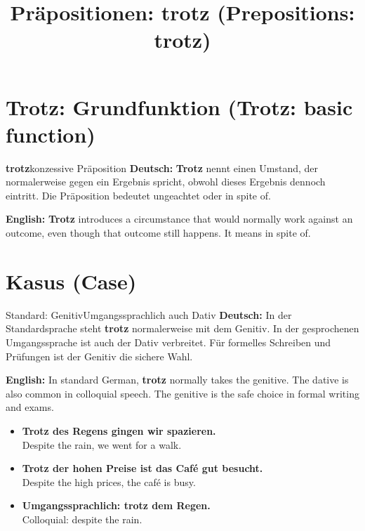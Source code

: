 \documentclass[a4paper,11pt]{article}
\title{Präpositionen: \glqq trotz\grqq{} \textnormal{(Prepositions: \glqq trotz\grqq)}}
\date{}
\newcommand{\GermanText}[1]{\textbf{Deutsch: }#1\par}
\newcommand{\EnglishText}[1]{{\small\color{SoftGray}\textbf{English: }#1\par}}
\newcommand{\ExampleItem}[2]{\item \textbf{#1}\\{\small\color{SoftGray}#2}}
\begin{document}
\maketitle
\tableofcontents
\newpage

\section{Trotz: Grundfunktion \textnormal{(Trotz: basic function)}}
\begin{grammarentry}{\textbf{trotz}}{konzessive Präposition}
\GermanText{\textbf{Trotz} nennt einen Umstand, der normalerweise gegen ein Ergebnis spricht, obwohl dieses Ergebnis dennoch eintritt. Die Präposition bedeutet \glqq ungeachtet\grqq{} oder \glqq in spite of\grqq.}
\EnglishText{\textbf{Trotz} introduces a circumstance that would normally work against an outcome, even though that outcome still happens. It means \glqq in spite of\grqq.}
\end{grammarentry}

\section{Kasus \textnormal{(Case)}}
\begin{grammarentry}{Standard: Genitiv}{Umgangssprachlich auch Dativ}
\GermanText{In der Standardsprache steht \textbf{trotz} normalerweise mit dem Genitiv. In der gesprochenen Umgangssprache ist auch der Dativ verbreitet. Für formelles Schreiben und Prüfungen ist der Genitiv die sichere Wahl.}
\EnglishText{In standard German, \textbf{trotz} normally takes the genitive. The dative is also common in colloquial speech. The genitive is the safe choice in formal writing and exams.}
\end{grammarentry}
\begin{exbox}
\begin{itemize}
\ExampleItem{Trotz des Regens gingen wir spazieren.}{Despite the rain, we went for a walk.}
\ExampleItem{Trotz der hohen Preise ist das Café gut besucht.}{Despite the high prices, the café is busy.}
\ExampleItem{Umgangssprachlich: trotz dem Regen.}{Colloquial: despite the rain.}
\end{itemize}
\end{exbox}
\end{document}
